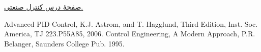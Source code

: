 \documentclass{article}
\begin{document}
\renewcommand{\section}[2]{}%
\begin{thebibliography}{99} %
 \href{https://aras.kntu.ac.ir/arascourses/industrial-control/}{صفحۀ درس کنترل صنعتی.}
\begin{LTRitems}
\resetlatinfont
{} Advanced PID Control, K.J. Astrom, and T. Hagglund, Third Edition, Inst. Soc. America, TJ 223.P55A85, 2006.
 Control Engineering, A Modern Approach, P.R. Belanger, Saunders College Pub. 1995.
\end{LTRitems}

\end{thebibliography}
\end{document}
